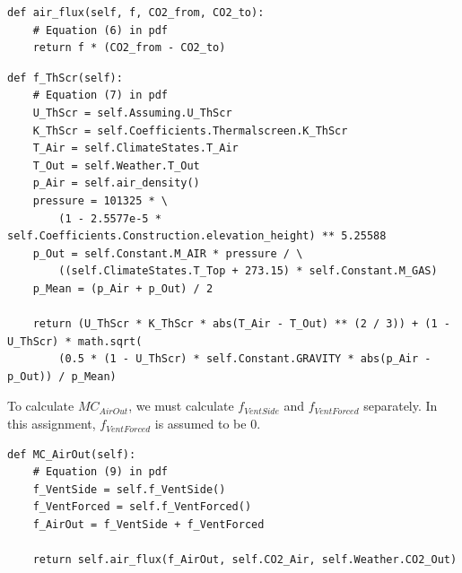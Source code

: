 \documentclass[a4paper]{article}
\begin{document}
\begin{mdframed}[leftline=false,rightline=false,backgroundcolor=magenta!10]
  \begin{verbatim}
def air_flux(self, f, CO2_from, CO2_to):
    # Equation (6) in pdf
    return f * (CO2_from - CO2_to)
  \end{verbatim}
\end{mdframed}

\begin{mdframed}[leftline=false,rightline=false,backgroundcolor=magenta!10]
  \begin{verbatim}
def f_ThScr(self):
    # Equation (7) in pdf
    U_ThScr = self.Assuming.U_ThScr
    K_ThScr = self.Coefficients.Thermalscreen.K_ThScr
    T_Air = self.ClimateStates.T_Air
    T_Out = self.Weather.T_Out
    p_Air = self.air_density()
    pressure = 101325 * \
        (1 - 2.5577e-5 * self.Coefficients.Construction.elevation_height) ** 5.25588
    p_Out = self.Constant.M_AIR * pressure / \
        ((self.ClimateStates.T_Top + 273.15) * self.Constant.M_GAS)
    p_Mean = (p_Air + p_Out) / 2

    return (U_ThScr * K_ThScr * abs(T_Air - T_Out) ** (2 / 3)) + (1 - U_ThScr) * math.sqrt(
        (0.5 * (1 - U_ThScr) * self.Constant.GRAVITY * abs(p_Air - p_Out)) / p_Mean)
  \end{verbatim}
\end{mdframed}

To calculate \(MC_{AirOut}\), we must calculate \(f_{VentSide}\) and \(f_{VentForced}\) separately.
In this assignment, \(f_{VentForced}\) is assumed to be 0.

\begin{mdframed}[leftline=false,rightline=false,backgroundcolor=magenta!10]
  \begin{verbatim}
def MC_AirOut(self):
    # Equation (9) in pdf
    f_VentSide = self.f_VentSide()
    f_VentForced = self.f_VentForced()
    f_AirOut = f_VentSide + f_VentForced

    return self.air_flux(f_AirOut, self.CO2_Air, self.Weather.CO2_Out)
  \end{verbatim}
\end{mdframed}
\end{document}
